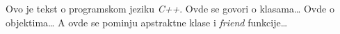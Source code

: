 ﻿\documentclass{article}
\begin{document}
\Large
Ovo je tekst o programskom jeziku {\em C++}.
Ovde se govori o klasama\ldots
\newpage
Ovde o objektima\ldots
\newpage
A ovde se pominju apstraktne klase i {\em
friend} funkcije\ldots
\newpage
\printindex
\end{document}
